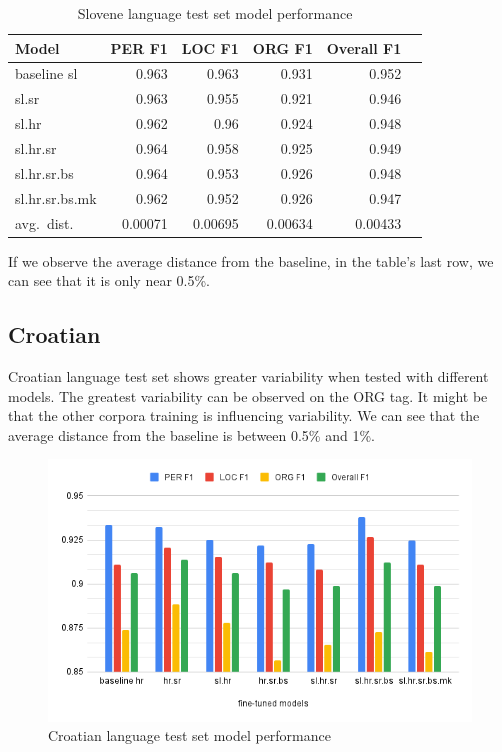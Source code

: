 \documentclass[sigconf]{acmart}
\begin{document}
\begin{table}[H]
  \caption{Slovene language test set model performance}
  \label{tab:eval_sl}
  \begin{tabular}{lrrrrr}
    \toprule
    Model&PER F1&LOC F1&ORG F1&Overall F1\\
    \midrule
    baseline sl&0.963&0.963&0.931&0.952\\
    \midrule
    sl.sr&0.963&0.955&0.921&0.946\\
    sl.hr&0.962&0.96&0.924&0.948\\
    sl.hr.sr&0.964&0.958&0.925&0.949\\
    sl.hr.sr.bs&0.964&0.953&0.926&0.948\\
    sl.hr.sr.bs.mk&0.962&0.952&0.926&0.947\\
    \midrule
    avg.\ dist.&0.00071&0.00695&0.00634&0.00433\\
    \bottomrule
  \end{tabular}
\end{table}

If we observe the average distance from the baseline, in the table's last row, we can see that it is only near 0.5\%.

\subsection{Croatian}
\label{subsec:croatian}

Croatian language test set shows greater variability when tested with different models.
The greatest variability can be observed on the ORG tag.
It might be that the other corpora training is influencing variability.
We can see that the average distance from the baseline is between 0.5\% and 1\%.
\begin{figure}[h]
  \caption{Croatian language test set model performance}
  \label{fig:eval_hr}
  \centering
  \includegraphics[width=\linewidth]{eval_hr}
\end{figure}
\end{document}
